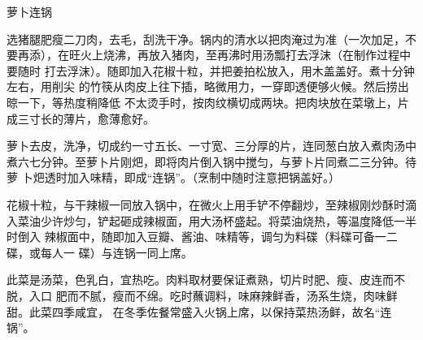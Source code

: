 \begin{recipe}{萝卜连锅}

\ingredients


\preparation

\step 选猪腿肥瘦二刀肉，去毛，刮洗干净。锅内的清水以把肉淹过为准（一次加足，不
要再添），在旺火上烧沸，再放入猪肉，至再沸时用汤瓢打去浮沫（在制作过程中要随时
打去浮沫）。随即加入花椒十粒，并把姜拍松放入，用木盖盖好。煮十分钟左右，用削尖
的竹筷从肉皮上往下插，略微用力，一穿即透便够火候。然后捞出晾一下，等热度稍降低
不太烫手时，按肉纹横切成两块。把肉块放在菜墩上，片成三寸长的薄片，愈薄愈好。

\step 萝卜去皮，洗净，切成约一寸五长、一寸宽、三分厚的片，连同葱白放入煮肉汤中
煮六七分钟。至萝卜片刚𤆵，即将肉片倒入锅中搅匀，与萝卜片同煮二三分钟。待萝
卜𤆵透时加入味精，即成“连锅”。（烹制中随时注意把锅盖好。）

\step 花椒十粒，与干辣椒一同放入锅中，在微火上用手铲不停翻炒，至辣椒刚炒酥时滴
入菜油少许炒匀，铲起砸成辣椒面，用大汤杯盛起。将菜油烧热，等温度降低一半时倒入
辣椒面中，随即加入豆瓣、酱油、味精等，调匀为料碟（料碟可备一二碟，或每人一
碟）与连锅一同上席。

\features

此菜是汤菜，色乳白，宜热吃。肉料取材要保证煮熟，切片时肥、瘦、皮连而不脱，入口
肥而不腻，瘦而不绵。吃时蘸调料，味麻辣鲜香，汤系生烧，肉味鲜甜。此菜四季咸宜，
在冬季佐餐常盛入火锅上席，以保持菜热汤鲜，故名“连锅”。

\end{recipe}


